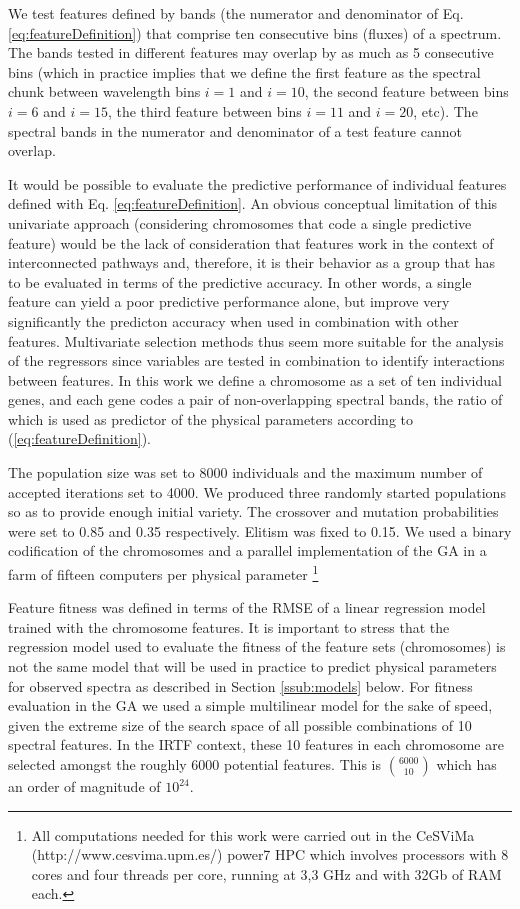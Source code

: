 We test features defined by bands (the numerator and denominator of
Eq. \ref{eq:featureDefinition}) that comprise ten consecutive bins
(fluxes) of a spectrum. The bands tested in different features may
overlap by as much as 5 consecutive bins (which in practice implies
that we define the first feature as the spectral chunk between
wavelength bins $i=1$ and $i=10$, the second feature between bins
$i=6$ and $i=15$, the third feature between bins $i=11$ and $i=20$,
etc). The spectral bands in the numerator and denominator of a test
feature cannot overlap.

It would be possible to evaluate the predictive performance of
individual features defined with Eq. \ref{eq:featureDefinition}. An obvious
conceptual limitation of this univariate approach (considering
chromosomes that code a single predictive feature) would be the lack
of consideration that features work in the context of interconnected
pathways and, therefore, it is their behavior as a group that has to
be evaluated in terms of the predictive accuracy. In other words, a
single feature can yield a poor predictive performance alone, but
improve very significantly the predicton accuracy when used in
combination with other features. Multivariate selection methods thus
seem more suitable for the analysis of the regressors since variables
are tested in combination to identify interactions between
features. In this work we define a chromosome as a set of ten
individual genes, and each gene codes a pair of non-overlapping
spectral bands, the ratio of which is used as predictor of the
physical parameters according to (\ref{eq:featureDefinition}).

The population size was set to 8000 individuals and the maximum number
of accepted iterations set to 4000. We produced three randomly started
populations so as to provide enough initial variety. The crossover and
mutation probabilities were set to 0.85 and 0.35 respectively. Elitism
was fixed to 0.15. We used a binary codification of the chromosomes
and a parallel implementation of the GA in a farm of fifteen computers
per physical parameter \footnote{All computations needed for this work
were carried out in the CeSViMa (http://www.cesvima.upm.es/) power7
HPC which involves processors with 8 cores and four threads per core,
running at 3,3 GHz and with 32Gb of RAM each.}

Feature fitness was defined in terms of the RMSE of a linear
regression model trained with the chromosome features. It is important
to stress that the regression model used to evaluate the fitness of
the feature sets (chromosomes) is not the same model that will be used
in practice to predict physical parameters for observed spectra as
described in Section \ref{ssub:models} below. For fitness evaluation
in the GA we used a simple multilinear model for the sake of speed,
given the extreme size of the search space of all possible
combinations of 10 spectral features. In the IRTF context, these 10
features in each chromosome are selected amongst the roughly 6000
potential features. This is $\binom{6000}{10}$ which has an order of
magnitude of $10^{24}$.

